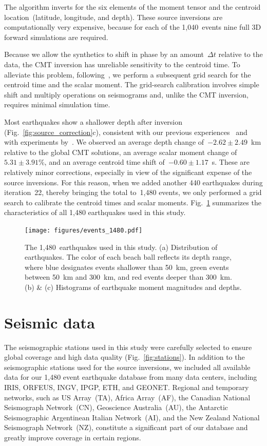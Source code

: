 \documentclass[extra,mreferee]{gji}
\begin{document}
The algorithm inverts for the six elements of the moment tensor
and the centroid location~(latitude, longitude, and depth).
These source inversions are computationally very expensive,
because for each of the 1,040~events nine full 3D forward simulations are required.

Because we allow the synthetics to shift in phase by an amount~$\Delta t$ relative to the data,
the CMT inversion has unreliable sensitivity to the centroid time.
To alleviate this problem,
following~\cite{zhu2012structure},
we perform a subsequent grid search for the centroid time and the scalar moment.
The grid-search calibration involves simple shift and multiply operations on seismograms
and, unlike the CMT inversion, requires minimal simulation time.

Most earthquakes show a shallower depth after inversion
(Fig.~\ref{fig:source_correction}c),
consistent with our previous experiences~\citep[e.g.,][]{zhu2015seismic,chen2015multiparameter,bozdaug2016global} and with experiments by~\cite{hjorleifsdottir2010effects}.
We observed an average depth change of~$-2.62\pm2.49$~km relative to the global CMT solutions,
an average scalar moment change of~$5.31\pm3.91$\%,
and an average centroid time shift of~$-0.60\pm1.17$~s.
These are relatively minor corrections, especially in view of the significant expense of the source inversions.
For this reason, when we added another 440 earthquakes during iteration~22,
thereby bringing the total to~1,480 events,
we only performed a grid search to calibrate the centroid times and scalar moments.
Fig.~\ref{fig:event_1480} summarizes the characteristics of all 1,480 earthquakes used in this study.

\begin{figure}
  \centering
  \texttt{[image: figures/events\_1480.pdf]}
  \caption{\small{The 1,480~earthquakes used in this study. (a) Distribution of earthquakes. The color of each beach ball reflects its depth range, where blue designates events shallower than 50~km, green events between 50~km and 300~km, and red events deeper than 300~km. (b) \& (c) Histograms of earthquake moment magnitudes and depths.}}
  \label{fig:event_1480}
\end{figure}


\section{Seismic data}
\label{section:data}

The seismographic stations used in this study were carefully selected to ensure global coverage
and high data quality (Fig.~\ref{fig:stations}).
In addition to the seismographic  stations used for the source inversions,
we included all available data for our 1,480 event earthquake database from many data centers,
including IRIS, ORFEUS, INGV, IPGP, ETH, and GEONET.
Regional and temporary networks,
such as US Array~(TA),
Africa Array~(AF), the Canadian National Seismograph Network~(CN), Geoscience Australia~(AU),
the Antarctic Seismographic Argentinean Italian Network~(AI),
and the New Zealand National Seismograph Network~(NZ),
constitute a significant part
of our database and greatly improve coverage in certain regions.
\end{document}
